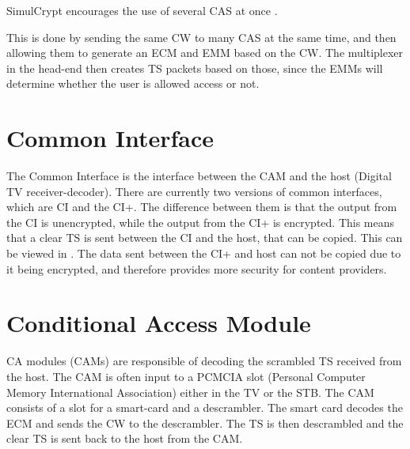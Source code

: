 SimulCrypt encourages the use of several CAS at once \citep[p. 17]{SimulCrypt:2008}. 

This is done by sending the same CW to many CAS at the same time, and then 
allowing them to generate an ECM and EMM based on the CW. The multiplexer in the 
head-end then creates TS packets based on those, since the EMMs will determine 
whether the user is allowed access or not. 

\section{Common Interface} \label{sec:CI}
The Common Interface is the interface between the CAM and the host (Digital TV 
receiver-decoder). There are currently two versions of common interfaces, which 
are CI and the CI+. The difference between them is that the output from the CI is
unencrypted, while the output from the CI+ is encrypted. This means that a clear 
TS is sent between the CI and the host, that can be copied. This can be viewed in
 \citet[p. 4]{CI:1997}. The data sent between the CI+ and host can not be copied 
due to it being encrypted, and therefore provides more security for content 
providers. \citep{CI+:2011}

\section{Conditional Access Module}\label{sec:CAM}
CA modules (CAMs) are responsible of decoding the scrambled TS received from 
the host. The CAM is often input to a PCMCIA slot (Personal Computer Memory 
International Association) either in the TV or the STB. The CAM consists of a 
slot for a smart-card and a descrambler. The smart card decodes the ECM and 
sends the CW to the descrambler. The TS is then descrambled and the clear TS is 
sent back to the host from the CAM.
